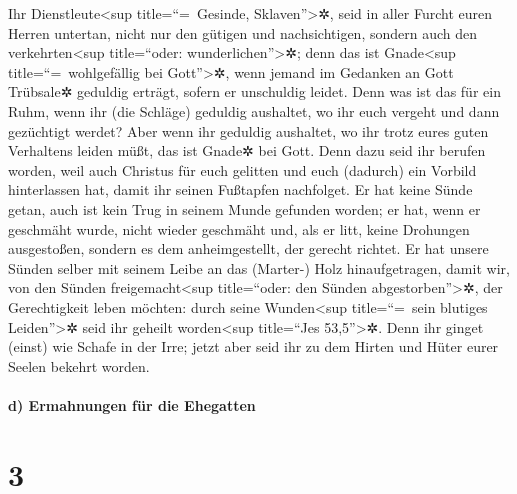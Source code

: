  Ihr Dienstleute\textless sup title=``=~Gesinde,
Sklaven''\textgreater✲, seid in aller Furcht euren Herren untertan,
nicht nur den gütigen und nachsichtigen, sondern auch den
verkehrten\textless sup title=``oder: wunderlichen''\textgreater✲;
 denn das ist Gnade\textless sup title=``=~wohlgefällig
bei Gott''\textgreater✲, wenn jemand im Gedanken an Gott Trübsale✲
geduldig erträgt, sofern er unschuldig leidet.  Denn was
ist das für ein Ruhm, wenn ihr (die Schläge) geduldig aushaltet, wo ihr
euch vergeht und dann gezüchtigt werdet? Aber wenn ihr geduldig
aushaltet, wo ihr trotz eures guten Verhaltens leiden müßt, das ist
Gnade✲ bei Gott.  Denn dazu seid ihr berufen worden, weil
auch Christus für euch gelitten und euch (dadurch) ein Vorbild
hinterlassen hat, damit ihr seinen Fußtapfen nachfolget. 
Er hat keine Sünde getan, auch ist kein Trug in seinem Munde gefunden
worden;  er hat, wenn er geschmäht wurde, nicht wieder
geschmäht und, als er litt, keine Drohungen ausgestoßen, sondern es dem
anheimgestellt, der gerecht richtet.  Er hat unsere
Sünden selber mit seinem Leibe an das (Marter-) Holz hinaufgetragen,
damit wir, von den Sünden freigemacht\textless sup title=``oder: den
Sünden abgestorben''\textgreater✲, der Gerechtigkeit leben möchten:
durch seine Wunden\textless sup title=``=~sein blutiges
Leiden''\textgreater✲ seid ihr geheilt worden\textless sup title=``Jes
53,5''\textgreater✲.  Denn ihr ginget (einst) wie Schafe
in der Irre; jetzt aber seid ihr zu dem Hirten und Hüter eurer Seelen
bekehrt worden.

\hypertarget{d-ermahnungen-fuxfcr-die-ehegatten}{%
\paragraph{d) Ermahnungen für die
Ehegatten}\label{d-ermahnungen-fuxfcr-die-ehegatten}}

\hypertarget{section-2}{%
\section{3}\label{section-2}}

